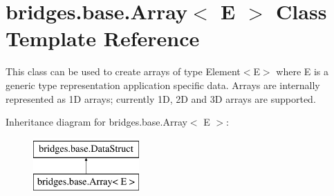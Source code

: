 \hypertarget{classbridges_1_1base_1_1_array}{}\section{bridges.\+base.\+Array$<$ E $>$ Class Template Reference}
\label{classbridges_1_1base_1_1_array}


This class can be used to create arrays of type Element$<$\+E$>$ where E is a generic type representation application specific data. Arrays are internally represented as 1\+D arrays; currently 1\+D, 2\+D and 3\+D arrays are supported.  


Inheritance diagram for bridges.\+base.\+Array$<$ E $>$\+:\begin{figure}[H]
\begin{center}
\leavevmode
\includegraphics[height=2.000000cm]{classbridges_1_1base_1_1_array}
\end{center}
\end{figure}
